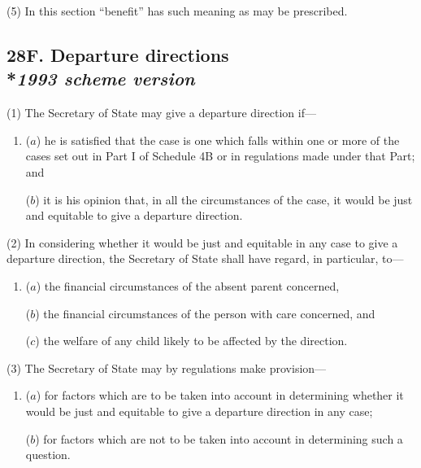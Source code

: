 \documentclass[12pt,a4paper]{article}
\begin{document}
(5) In this section “benefit” has such meaning as may be prescribed.



\subsection[28F. Departure directions --- \emph{1993 scheme version}]{28F. Departure directions\\*\emph{1993 scheme version}}

(1) The Secretary of State may give a departure direction if—
\begin{enumerate}\item[]
($a$) he is satisfied that the case is one which falls within one or more of the cases set out in Part I of Schedule 4B or in regulations made under that Part; and

($b$) it is his opinion that, in all the circumstances of the case, it would be just and equitable to give a departure direction.
\end{enumerate}

(2) In considering whether it would be just and equitable in any case to give a departure direction, the Secretary of State shall have regard, in particular, to—
\begin{enumerate}\item[]
($a$) the financial circumstances of the absent parent concerned,

($b$) the financial circumstances of the person with care concerned, and

($c$) the welfare of any child likely to be affected by the direction.
\end{enumerate}

(3) The Secretary of State may by regulations make provision—
\begin{enumerate}\item[]
($a$) for factors which are to be taken into account in determining whether it would be just and equitable to give a departure direction in any case;

($b$) for factors which are not to be taken into account in determining such a question.
\end{enumerate}
\end{document}
